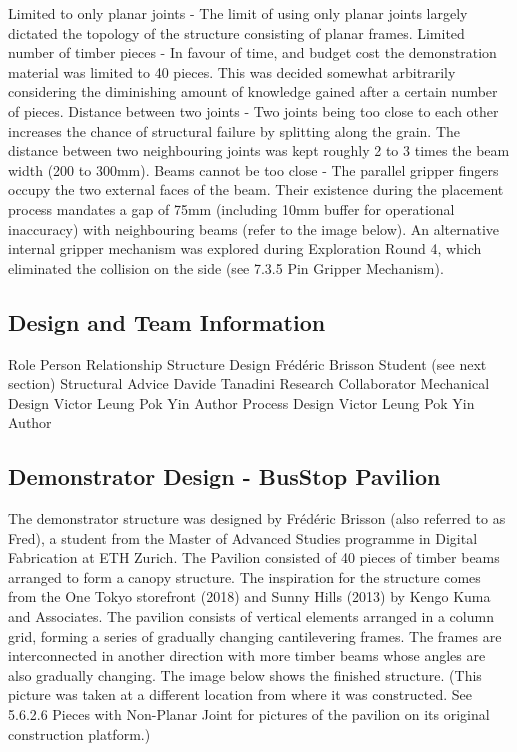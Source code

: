 Limited to only planar joints - The limit of using only planar joints largely dictated the topology of the structure consisting of planar frames. 
Limited number of timber pieces - In favour of time, and budget cost the demonstration material was limited to 40 pieces. This was decided somewhat arbitrarily considering the diminishing amount of knowledge gained after a certain number of pieces.
Distance between two joints - Two joints being too close to each other increases the chance of structural failure by splitting along the grain. The distance between two neighbouring joints was kept roughly 2 to 3 times the beam width (200 to 300mm).
Beams cannot be too close - The parallel gripper fingers occupy the two external faces of the beam. Their existence during the placement process mandates a gap of 75mm (including 10mm buffer for operational inaccuracy) with neighbouring beams (refer to the image below). An alternative internal gripper mechanism was explored during Exploration Round 4, which eliminated the collision on the side (see 7.3.5 Pin Gripper Mechanism).

\subsection{Design and Team Information}
\label{subsection:exploration_2_design_and_team_information}

Role
Person
Relationship
Structure Design
Frédéric Brisson
Student (see next section)
Structural Advice
Davide Tanadini
Research Collaborator
Mechanical Design
Victor Leung Pok Yin
Author
Process Design
Victor Leung Pok Yin
Author


\subsection{Demonstrator Design - BusStop Pavilion}
\label{subsection:exploration_2_demonstrator_design_busstop_pavilion}

The demonstrator structure was designed by Frédéric Brisson (also referred to as Fred), a student from the Master of Advanced Studies programme in Digital Fabrication at ETH Zurich. The Pavilion consisted of 40 pieces of timber beams arranged to form a canopy structure. 
The inspiration for the structure comes from the One Tokyo storefront (2018) and Sunny Hills (2013) by Kengo Kuma and Associates. The pavilion consists of vertical elements arranged in a column grid, forming a series of gradually changing cantilevering frames. The frames are interconnected in another direction with more timber beams whose angles are also gradually changing.
The image below shows the finished structure. (This picture was taken at a different location from where it was constructed. See 5.6.2.6 Pieces with Non-Planar Joint for pictures of the pavilion on its original construction platform.)

